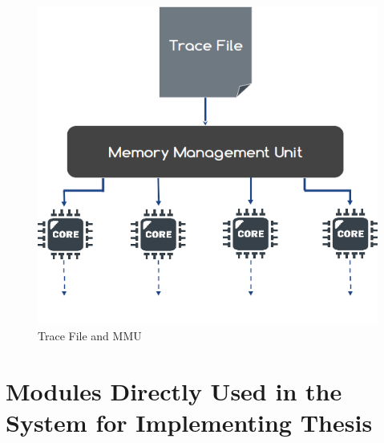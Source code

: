 \documentclass{listhesis}
\begin{document}
\begin{figure}[h!]
  \includegraphics[width=0.7\linewidth]{traceFile.png}
  \centering
  \caption{Trace File and MMU}
  \label{fig:traceFile}
\end{figure}
\section{Modules Directly Used in the System for Implementing Thesis}
\end{document}
